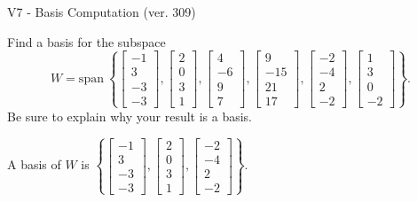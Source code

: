 \begin{exercise}
  \begin{exerciseTitle}V7 - Basis Computation (ver. 309)\end{exerciseTitle}
  \begin{exerciseStatement}
    Find a basis for the subspace 
\[W=\mathrm{span}\ \left\{\left[\begin{array}{r}
-1 \\
3 \\
-3 \\
-3
\end{array}\right] , \left[\begin{array}{r}
2 \\
0 \\
3 \\
1
\end{array}\right] , \left[\begin{array}{r}
4 \\
-6 \\
9 \\
7
\end{array}\right] , \left[\begin{array}{r}
9 \\
-15 \\
21 \\
17
\end{array}\right] , \left[\begin{array}{r}
-2 \\
-4 \\
2 \\
-2
\end{array}\right] , \left[\begin{array}{r}
1 \\
3 \\
0 \\
-2
\end{array}\right]\right\}.\]
 Be sure to explain why your result is a basis.


  \end{exerciseStatement}
  \begin{exerciseAnswer}
   A basis of \(W\) is  \(\left\{\left[\begin{array}{r}
-1 \\
3 \\
-3 \\
-3
\end{array}\right] , \left[\begin{array}{r}
2 \\
0 \\
3 \\
1
\end{array}\right] , \left[\begin{array}{r}
-2 \\
-4 \\
2 \\
-2
\end{array}\right]\right\}\).
  


  \end{exerciseAnswer}
\end{exercise}